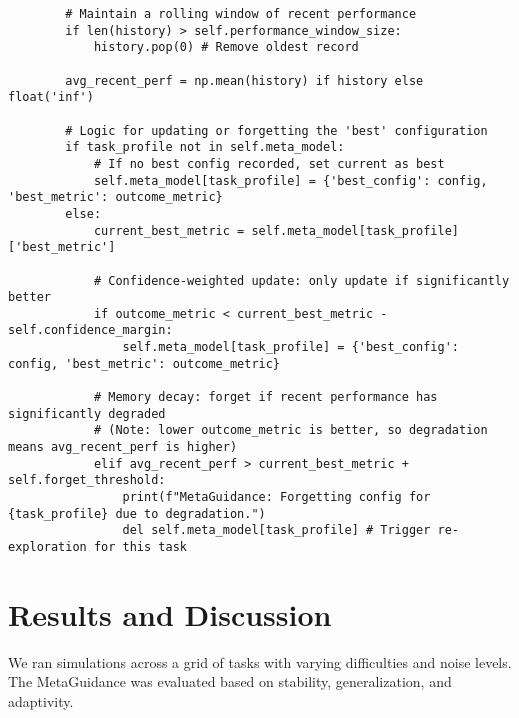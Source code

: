 \documentclass{article}
\begin{document}
\begin{verbatim}
        # Maintain a rolling window of recent performance
        if len(history) > self.performance_window_size:
            history.pop(0) # Remove oldest record

        avg_recent_perf = np.mean(history) if history else float('inf')

        # Logic for updating or forgetting the 'best' configuration
        if task_profile not in self.meta_model:
            # If no best config recorded, set current as best
            self.meta_model[task_profile] = {'best_config': config, 'best_metric': outcome_metric}
        else:
            current_best_metric = self.meta_model[task_profile]['best_metric']
            
            # Confidence-weighted update: only update if significantly better
            if outcome_metric < current_best_metric - self.confidence_margin:
                self.meta_model[task_profile] = {'best_config': config, 'best_metric': outcome_metric}
            
            # Memory decay: forget if recent performance has significantly degraded
            # (Note: lower outcome_metric is better, so degradation means avg_recent_perf is higher)
            elif avg_recent_perf > current_best_metric + self.forget_threshold:
                print(f"MetaGuidance: Forgetting config for {task_profile} due to degradation.")
                del self.meta_model[task_profile] # Trigger re-exploration for this task
\end{verbatim}

\section{Results and Discussion}
We ran simulations across a grid of tasks with varying difficulties and noise levels. The MetaGuidance was evaluated based on stability, generalization, and adaptivity.
\end{document}
